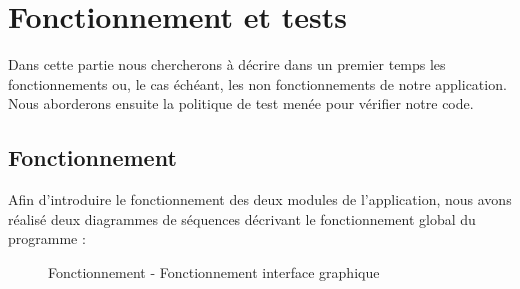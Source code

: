\chapter{Fonctionnement et tests}

Dans cette partie nous chercherons à décrire dans un premier temps les fonctionnements ou, le cas échéant, les non fonctionnements de notre application. Nous aborderons ensuite la politique de test menée pour vérifier notre code. 

\section{Fonctionnement}

Afin d'introduire le fonctionnement des deux modules de l'application, nous avons réalisé deux diagrammes de séquences décrivant le fonctionnement global du programme :

\begin{figure}[!ht]
\begin{center}
  \caption{Fonctionnement - Fonctionnement interface graphique}
  \label{sequence} 
\end{center}
\end{figure}

